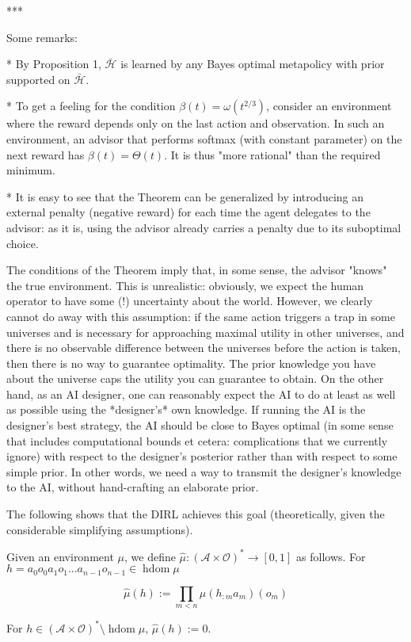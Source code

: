 \documentclass[a4paper]{article}
\newcommand{\Ob}{\mathcal{O}}
\newcommand{\A}{\mathcal{A}}
\newcommand{\FH}{(\A \times \Ob)^*}
\DeclareMathOperator{\HD}{hdom}
\newcommand{\Hy}{\mathcal{H}}
\begin{document}
***

Some remarks:

* By Proposition 1, $\bar{\Hy}$ is learned by any Bayes optimal metapolicy with prior supported on $\bar{\Hy}$.

* To get a feeling for the condition $\beta(t)=\omega(t^{2/3})$, consider an environment where the reward depends only on the last action and observation. In such an environment, an advisor that performs softmax (with constant parameter) on the next reward has $\beta(t) = \Theta(t)$. It is thus "more rational" than the required minimum.

* It is easy to see that the Theorem can be generalized by introducing an external penalty (negative reward) for each time the agent delegates to the advisor: as it is, using the advisor already carries a penalty due to its suboptimal choice.

The conditions of the Theorem imply that, in some sense, the advisor "knows" the true environment. This is unrealistic: obviously, we expect the human operator to have some (!) uncertainty about the world. However, we clearly cannot do away with this assumption: if the same action triggers a trap in some universes and is necessary for approaching maximal utility in other universes, and there is no observable difference between the universes before the action is taken, then there is no way to guarantee optimality. The prior knowledge you have about the universe caps the utility you can guarantee to obtain. On the other hand, as an AI designer, one can reasonably expect the AI to do at least as well as possible using the *designer's* own knowledge. If running the AI is the designer's best strategy, the AI should be close to Bayes optimal (in some sense that includes computational bounds et cetera: complications that we currently ignore) with respect to the designer's posterior rather than with respect to some simple prior. In other words, we need a way to transmit the designer's knowledge to the AI, without hand-crafting an elaborate prior.

The following shows that the DIRL achieves this goal (theoretically, given the considerable simplifying assumptions). 

Given an environment $\mu$, we define $\hat{\mu}: \FH \rightarrow [0,1]$ as follows. For $h = a_0 o_0 a_1 o_1 \ldots a_{n-1} o_{n-1} \in \HD{\mu}$

$$\hat{\mu}(h):=\prod_{m < n} \mu(h_{:m}a_m)(o_m)$$

For $h \in \FH \setminus \HD{\mu}$, $\hat{\mu}(h):=0$.
\end{document}
